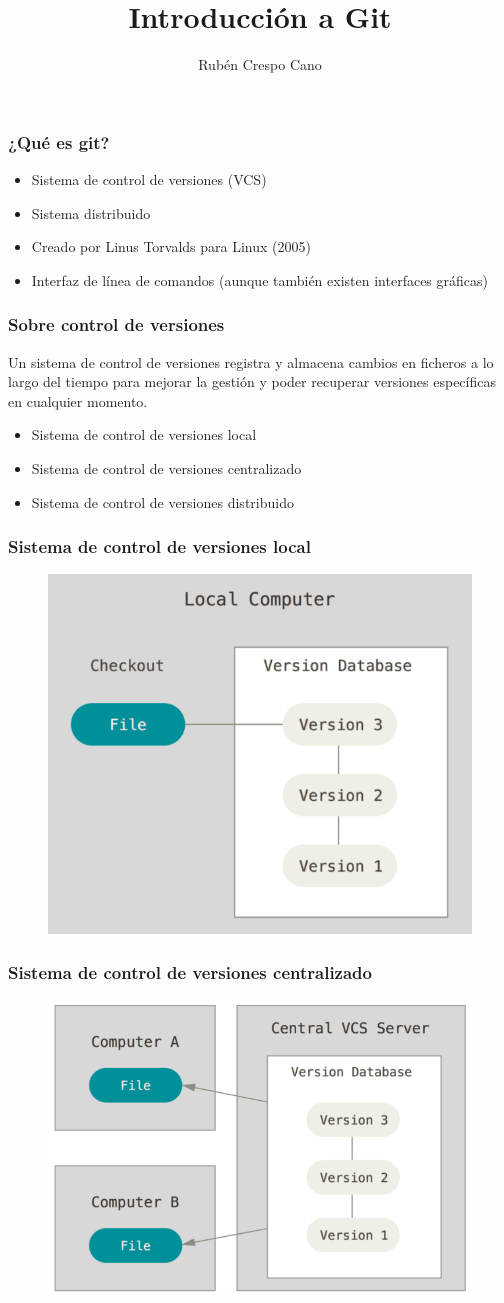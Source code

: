 \documentclass{beamer}
\title[Introducción a Git]{Introducción a Git}
\author{Rubén Crespo Cano}
\institute[]
{
{\color{gray}\textit{@rcrespocano}}
}
\date{}
\begin{document}
\begin{frame}
\titlepage
\end{frame}

\begin{frame}
\frametitle{¿Qué es git?}
\begin{itemize}
\item Sistema de control de versiones (VCS)
\item Sistema distribuido
\item Creado por Linus Torvalds para Linux (2005)
\item Interfaz de línea de comandos (aunque también existen interfaces gráficas)
\end{itemize}
\end{frame}

\begin{frame}
\frametitle{Sobre control de versiones}
Un sistema de control de versiones registra y almacena cambios en ficheros a lo largo del tiempo para mejorar la gestión y poder recuperar versiones específicas en cualquier momento.
\vskip 0.50cm
\begin{itemize}
\item Sistema de control de versiones local
\item Sistema de control de versiones centralizado
\item Sistema de control de versiones distribuido
\end{itemize}
\end{frame}

\begin{frame}
\frametitle{Sistema de control de versiones local}
\begin{figure}
\includegraphics[width=0.50\linewidth]{img/local.png}
\end{figure}
\end{frame}

\begin{frame}
\frametitle{Sistema de control de versiones centralizado}
\begin{figure}
\includegraphics[width=0.50\linewidth]{img/centralized.png}
\end{figure}
\end{frame}
\end{document}
